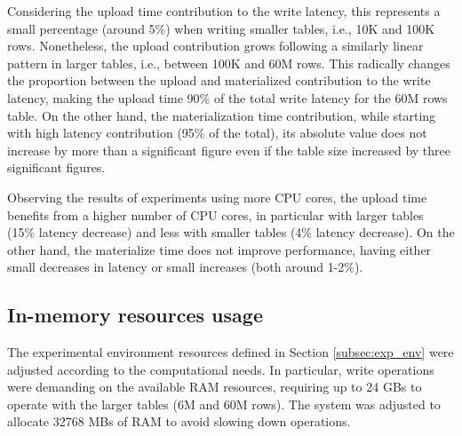 Considering the upload time contribution to the write latency, this represents a small percentage (around 5\%) when writing smaller tables, i.e., 10K and 100K rows. Nonetheless, the upload contribution grows following a similarly linear pattern in larger tables, i.e., between 100K and 60M rows. This radically changes the proportion between the upload and materialized contribution to the write latency, making the upload time 90\% of the total write latency for the 60M rows table. On the other hand, the materialization time contribution, while starting with high latency contribution (95\% of the total), its absolute value does not increase by more than a significant figure even if the table size increased by three significant figures.

Observing the results of experiments using more \gls{CPU} cores, the upload time benefits from a higher number of \gls{CPU} cores, in particular with larger tables (15\% latency decrease) and less with smaller tables (4\% latency decrease). On the other hand, the materialize time does not improve performance, having either small decreases in latency or small increases (both around 1-2\%).

\subsection{In-memory resources usage}
\label{subsec:resources_usage}

The experimental environment resources defined in Section \ref{subsec:exp_env} were adjusted according to the computational needs. In particular, write operations were demanding on the available \gls{RAM} resources, requiring up to 24 GBs to operate with the larger tables (6M and 60M rows). The system was adjusted to allocate 32768 MBs of \gls{RAM} to avoid slowing down operations.